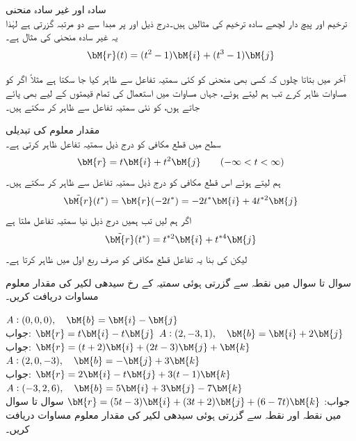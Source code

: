 \quad سادہ اور غیر سادہ منحنی\\
ترخیم اور پیچ دار لچھے سادہ ترخیم کی مثالیں ہیں۔درج ذیل  اور  پر مبدا سے دو مرتبہ گزرتی ہے لہٰذا یہ غیر سادہ منحنی کی مثال ہے۔
\begin{align*}
\bM{r}(t)=(t^2-1)\bM{i}+(t^3-1)\bM{j}
\end{align*}

آخر میں بتاتا چلوں کہ کسی بھی منحنی  کو کئی سمتیہ  تفاعل سے ظاہر کیا جا سکتا ہے مثلاً اگر  کو مساوات  ظاہر کرے تب ہم  لیتے ہوئے، جہاں مساوات  میں استعمال  کی تمام قیمتوں کے لیے   بھی پائے جاتے ہوں،   کو نئی سمتیہ  تفاعل  سے ظاہر کر سکتے ہیں۔

\quad مقدار معلوم کی تبدیلی\\
 سطح میں قطع مکافی  کو درج ذیل سمتیہ تفاعل ظاہر کرتی ہے۔
\begin{align}
\bM{r}=t\bM{i}+t^2\bM{j}\quad \quad (-\infty < t < \infty)
\end{align}
ہم  لیتے ہوئے اس قطع مکافی کو درج ذیل سمتیہ  تفاعل سے ظاہر کر سکتے ہیں۔
\begin{align*}
\tilde{\bM{r}}(t^*)=\bM{r}(-2t^*)=-2t^*\bM{i}+4t^{*2}\bM{j}
\end{align*}
اگر ہم  لیں تب ہمیں درج ذیل نیا سمتیہ  تفاعل ملتا ہے
\begin{align*}
\tilde{\bM{r}}(t^*)=t^{*2}\bM{i}+t^{*4}\bM{j}
\end{align*} 
لیکن  کی بنا یہ تفاعل قطع مکافی کو صرف ربع اول میں ظاہر کرتا ہے۔

سوال  تا سوال  میں نقطہ  سے گزرتی ہوئی سمتیہ  کے رخ سیدھی لکیر کی مقدار معلوم مساوات دریافت کریں۔

\quad 
$A:(0,0,0),\quad \bM{b}=\bM{i}-\bM{j}$\\
جواب:
$\bM{r}=t\bM{i}-t\bM{j}$
\quad 
$A:(2,-3,1),\quad \bM{b}=\bM{i}+2\bM{j}$\\
جواب:
$\bM{r}=(t+2)\bM{i}+(2t-3)\bM{j}+\bM{k}$
\quad 
$A:(2,0,-3),\quad \bM{b}=-\bM{j}+3\bM{k}$\\
جواب:
$\bM{r}=2\bM{i}-t\bM{j}+3(t-1)\bM{k}$
\quad 
$A:(-3,2,6),\quad \bM{b}=5\bM{i}+3\bM{j}-7\bM{k}$\\
جواب:
$\bM{r}=(5t-3)\bM{i}+(3t+2)\bM{j}+(6-7t)\bM{k}$
سوال  تا سوال  میں نقطہ  اور نقطہ  سے گزرتی ہوئی سیدھی لکیر کی مقدار معلوم مساوات دریافت کریں۔

